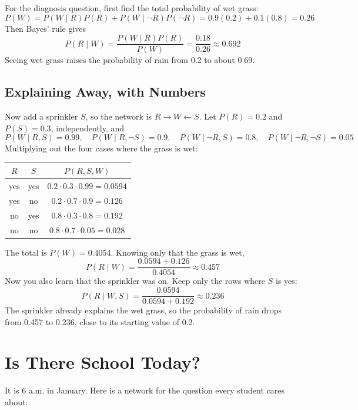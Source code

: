 For the diagnosis question, first find the total probability of wet grass:
$$P(W) = P(W \mid R)P(R) + P(W \mid \neg R)P(\neg R) = 0.9(0.2) + 0.1(0.8) = 0.26$$
Then Bayes' rule gives
$$P(R \mid W) = \frac{P(W \mid R) P(R)}{P(W)} = \frac{0.18}{0.26} \approx 0.692$$
Seeing wet grass raises the probability of rain from 0.2 to about 0.69.

\subsection{Explaining Away, with Numbers}
Now add a sprinkler $S$, so the network is $R \to W \leftarrow S$. Let $P(R) = 0.2$ and $P(S) = 0.3$,
independently, and
$$P(W \mid R, S) = 0.99, \quad P(W \mid R, \neg S) = 0.9, \quad P(W \mid \neg R, S) = 0.8, \quad
P(W \mid \neg R, \neg S) = 0.05$$
Multiplying out the four cases where the grass is wet:
\begin{center}
\begin{tabular}{c|c|c}
$R$ & $S$ & $P(R, S, W)$ \\
\hline
yes & yes & $0.2 \cdot 0.3 \cdot 0.99 = 0.0594$ \\
yes & no & $0.2 \cdot 0.7 \cdot 0.9 = 0.126$ \\
no & yes & $0.8 \cdot 0.3 \cdot 0.8 = 0.192$ \\
no & no & $0.8 \cdot 0.7 \cdot 0.05 = 0.028$ \\
\end{tabular}
\end{center}
The total is $P(W) = 0.4054$. Knowing only that the grass is wet,
$$P(R \mid W) = \frac{0.0594 + 0.126}{0.4054} \approx 0.457$$
Now you also learn that the sprinkler was on. Keep only the rows where $S$ is yes:
$$P(R \mid W, S) = \frac{0.0594}{0.0594 + 0.192} \approx 0.236$$
The sprinkler already explains the wet grass, so the probability of rain drops from 0.457 to 0.236, close to its
starting value of 0.2.

\section{Is There School Today?}
It is 6 a.m. in January. Here is a network for the question every student cares about:

